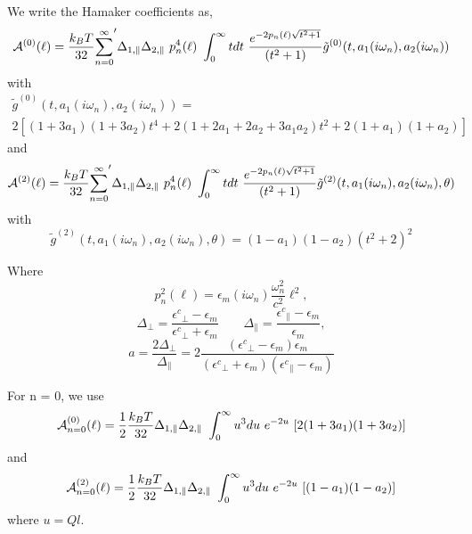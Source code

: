 \documentclass[a4paper]{article}
\begin{document}
\begin{center}
We write the Hamaker coefficients as,
\begin{equation}
{\cal A}^{(0)}(\ell) = \frac{k_BT}{32}  {\sum_{n=0}^{\infty}}' \Delta_{1,\parallel} \Delta_{2,\parallel} ~p_n^{4}(\ell) ~\int_0^{\infty} t dt ~\frac{e^{- 2 p_n(\ell) \sqrt{t^{2} + 1}}}{(t^{2} + 1)} \tilde g^{(0)}(t, a_1(i \omega_n), a_2(i \omega_n))
\end{equation}
with
\begin{multline*}
\tilde g^{(0)}(t, a_1(i \omega_n), a_2(i \omega_n)) = \\ 
2 \left[ (1+3a_1)(1+3a_2) t^{4} + 2 (1+2a_1+2a_2+3a_1a_2) t^{2}  + 2(1+a_1)(1+a_2)\right]
\end{multline*}
and
\begin{equation}
{\cal A}^{(2)}(\ell) = \frac{k_BT}{32}  {\sum_{n=0}^{\infty}}' \Delta_{1,\parallel} \Delta_{2,\parallel} ~p_n^{4}(\ell) ~\int_0^{\infty} t dt ~\frac{e^{- 2 p_n(\ell) \sqrt{t^{2} + 1}}}{(t^{2} + 1)} \tilde g^{(2)}(t, a_1(i \omega_n), a_2(i \omega_n), \theta)
\end{equation}
with
\begin{equation*}
\tilde g^{(2)}(t, a_1(i \omega_n), a_2(i \omega_n), \theta) = (1-a_1)(1-a_2)(t^{2} + 2)^2
\label{befgqw}
\end{equation*}

Where
\begin{equation*}
p_n^{2}(\ell) =  \epsilon_m(i \omega_n) \frac{\omega_n^{2}}{c^{2}} \ell^{2},
\end{equation*}
\begin{equation*}
\Delta_{\perp}=\frac{{\epsilon^{c}}_{\perp}-\epsilon_{m}}{{\epsilon^{c}}_{\perp}+\epsilon_{m}}\qquad\Delta_{\parallel}=\frac{{\epsilon^{c}}_{\parallel}-\epsilon_{m}}{\epsilon_{m}},
\label{anisoind}
\end{equation*}
\begin{equation*}
a = \frac{2 \Delta_{\perp}}{\Delta_{\parallel}} = 2 \frac{({\epsilon^{c}}_{\perp}-\epsilon_{m}) \epsilon_{m}}{({\epsilon^{c}}_{\perp}+\epsilon_{m}) ({\epsilon^{c}}_{\parallel}-\epsilon_{m})}
\label{eq:adef}
\end{equation*}

For n = 0, we use
\begin{equation}
    {\cal A}_{n=0}^{(0)}(\ell) = \frac{1}{2} \frac{k_BT}{32}
    \Delta_{1,\parallel} \Delta_{2,\parallel} ~\int_0^{\infty} u^3 du\,\,
    e^{-2u}\,\,[2(1 + 3a_1)(1 + 3a_2) ]
\end{equation}
and
\begin{equation}
    {\cal A}_{n=0}^{(2)}(\ell) = \frac{1}{2} \frac{k_BT}{32}
    \Delta_{1,\parallel} \Delta_{2,\parallel} ~\int_0^{\infty} u^3 du\,\,
    e^{-2u}\,\,[(1 - a_1)(1 - a_2) ]
\end{equation}
where $u = Ql$.



\end{center}
\end{document}
